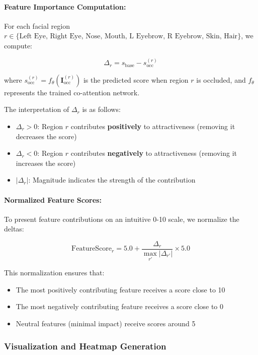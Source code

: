 \paragraph{Feature Importance Computation:}
For each facial region $r \in \{\text{Left Eye, Right Eye, Nose, Mouth, L Eyebrow, R Eyebrow, Skin, Hair}\}$, we compute:

\begin{equation}
\Delta_r = s_{\text{base}} - s_{\text{occ}}^{(r)}
\end{equation}

where $s_{\text{occ}}^{(r)} = f_{\theta}(\mathbf{I}_{\text{occ}}^{(r)})$ is the predicted score when region $r$ is occluded, and $f_{\theta}$ represents the trained co-attention network.

The interpretation of $\Delta_r$ is as follows:
\begin{itemize}
    \item $\Delta_r > 0$: Region $r$ contributes \textbf{positively} to attractiveness (removing it decreases the score)
    \item $\Delta_r < 0$: Region $r$ contributes \textbf{negatively} to attractiveness (removing it increases the score)
    \item $|\Delta_r|$: Magnitude indicates the strength of the contribution
\end{itemize}

\paragraph{Normalized Feature Scores:}
To present feature contributions on an intuitive 0-10 scale, we normalize the deltas:

\begin{equation}
\text{FeatureScore}_r = 5.0 + \frac{\Delta_r}{\max_{r'} |\Delta_{r'}|} \times 5.0
\end{equation}

This normalization ensures that:
\begin{itemize}
    \item The most positively contributing feature receives a score close to 10
    \item The most negatively contributing feature receives a score close to 0
    \item Neutral features (minimal impact) receive scores around 5
\end{itemize}

\subsubsection{Visualization and Heatmap Generation}

